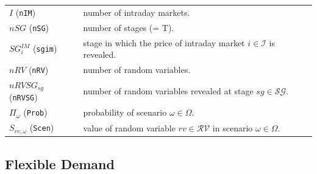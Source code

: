 \begin{tabularx}{\textwidth}{l X}
    $I$ (\texttt{nIM}) & number of intraday markets. \\
    $nSG$ (\texttt{nSG}) & number of stages (= T). \\
    $SG^{IM}_i$ (\texttt{sgim}) & stage in which the price of intraday market $i \in \mathcal{I}$ is revealed. \\
    $nRV$ (\texttt{nRV}) & number of random variables. \\
    $nRVSG_{sg}$ (\texttt{nRVSG}) & number of random variables revealed at stage $sg \in \mathcal{SG}$. \\
    $\Pi_{\omega}$ (\texttt{Prob}) & probability of scenario $\omega \in \Omega$. \\
    $S_{rv, \omega}$ (\texttt{Scen}) & value of random variable $rv \in \mathcal{RV}$ in scenario $\omega \in \Omega$. \\    

\end{tabularx}

\subsection{Flexible Demand}
\label{SEC:FlexibleDemand2}

